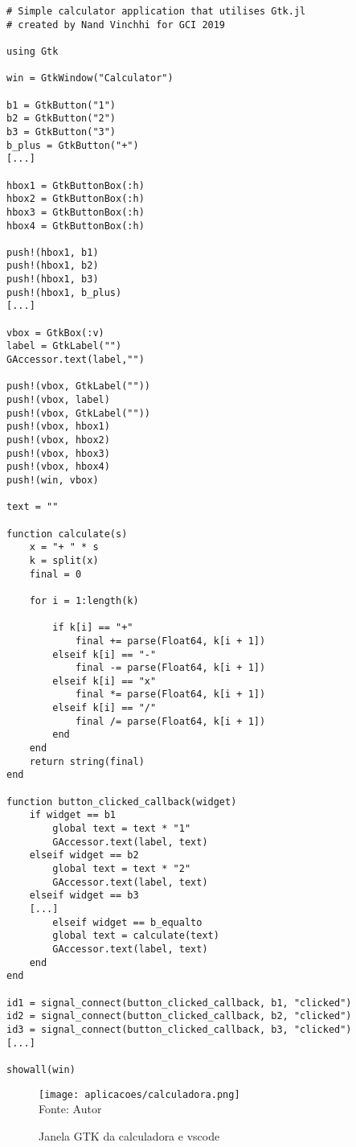 \begin{lstlisting}[label={calculadora_code},caption={Calculadora simples em GTK}]
# Simple calculator application that utilises Gtk.jl
# created by Nand Vinchhi for GCI 2019

using Gtk

win = GtkWindow("Calculator")

b1 = GtkButton("1")
b2 = GtkButton("2")
b3 = GtkButton("3")
b_plus = GtkButton("+")
[...]
 
hbox1 = GtkButtonBox(:h)
hbox2 = GtkButtonBox(:h)
hbox3 = GtkButtonBox(:h)
hbox4 = GtkButtonBox(:h)

push!(hbox1, b1)
push!(hbox1, b2)
push!(hbox1, b3)
push!(hbox1, b_plus)
[...]

vbox = GtkBox(:v)
label = GtkLabel("")
GAccessor.text(label,"")

push!(vbox, GtkLabel(""))
push!(vbox, label)
push!(vbox, GtkLabel(""))
push!(vbox, hbox1)
push!(vbox, hbox2)
push!(vbox, hbox3)
push!(vbox, hbox4)
push!(win, vbox)

text = ""

function calculate(s)
	x = "+ " * s
	k = split(x)
	final = 0
	
	for i = 1:length(k)
		
		if k[i] == "+"
			final += parse(Float64, k[i + 1])
		elseif k[i] == "-"
			final -= parse(Float64, k[i + 1])
		elseif k[i] == "x"
			final *= parse(Float64, k[i + 1])
		elseif k[i] == "/"
			final /= parse(Float64, k[i + 1])
		end
	end
	return string(final)
end

function button_clicked_callback(widget)
	if widget == b1
		global text = text * "1"
        GAccessor.text(label, text)
    elseif widget == b2
    	global text = text * "2"
        GAccessor.text(label, text)
    elseif widget == b3
    [...]
        elseif widget == b_equalto
    	global text = calculate(text)
        GAccessor.text(label, text)
    end
end

id1 = signal_connect(button_clicked_callback, b1, "clicked")
id2 = signal_connect(button_clicked_callback, b2, "clicked")
id3 = signal_connect(button_clicked_callback, b3, "clicked")
[...]

showall(win)

\end{lstlisting}


\begin{figure}[H]
   \begin{center}
       \caption{Janela GTK da calculadora e vscode} \label{calculadora}
       \texttt{[image: aplicacoes/calculadora.png]} \\
       {\tiny \sf Fonte: Autor}
   \end{center}
  \end{figure}






